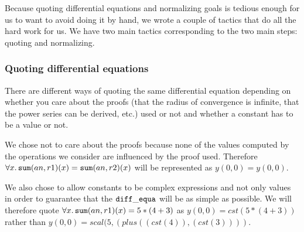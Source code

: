 \documentclass{article}
\begin{document}
Because quoting differential equations and normalizing goals is tedious enough
for us to want to avoid doing it by hand, we wrote a couple of tactics that do
all the hard work for us. We have two main tactics corresponding to the two
main steps: quoting and normalizing.

\subsubsection{Quoting differential equations}

There are different ways of quoting the same differential equation depending on
whether you care about the proofs (that the radius of convergence is infinite,
that the power series can be derived, etc.) used or not and whether a constant
has to be a value or not.

We chose not to care about the proofs because none of the values computed by the
operations we consider are influenced by the proof used. Therefore
$\forall x. \operatorname{\mathtt{sum}}(an, r1)(x) = \operatorname{\mathtt{sum}}(an, r2)(x)$ will be represented as
$y(0,0) = y(0,0)$.

We also chose to allow constants to be complex expressions and not only values
in order to guarantee that the $\operatorname{\mathtt{diff\_equa}}$ will be as simple as possible.
We will therefore quote $\forall x. \operatorname{\mathtt{sum}}(an,  r1)(x) = 5 * (4 + 3)$ as
$y(0,0) = cst (5 * (4 + 3))$ rather than $y(0,0) = scal (5, (plus ((cst(4)), (cst(3))))$.
\end{document}
